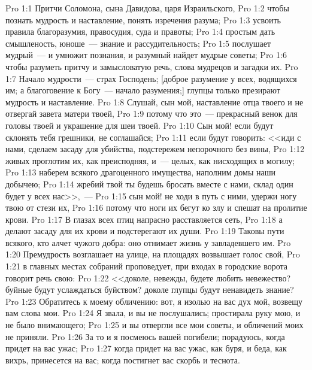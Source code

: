 \vs Pro 1:1 Притчи Соломона, сына Давидова, царя Израильского,
\vs Pro 1:2 чтобы познать мудрость и наставление, понять изречения разума;
\vs Pro 1:3 усвоить правила благоразумия, правосудия, суда и правоты;
\vs Pro 1:4 простым дать смышленость, юноше~--- знание и рассудительность;
\vs Pro 1:5 послушает мудрый~--- и умножит познания, и разумный найдет мудрые советы;
\vs Pro 1:6 чтобы разуметь притчу и замысловатую речь, слова мудрецов и загадки их.
\rsbpar\vs Pro 1:7 Начало мудрости~--- страх Господень; [доброе разумение у всех, водящихся им; а благоговение к Богу~--- начало разумения;] глупцы только презирают мудрость и наставление.
\vs Pro 1:8 Слушай, сын мой, наставление отца твоего и не отвергай завета матери твоей,
\vs Pro 1:9 потому что это~--- прекрасный венок для головы твоей и украшение для шеи твоей.
\vs Pro 1:10 Сын мой! если будут склонять тебя грешники, не соглашайся;
\vs Pro 1:11 если будут говорить: <<иди с нами, сделаем засаду для убийства, подстережем непорочного без вины,
\vs Pro 1:12 живых проглотим их, как преисподняя, и~--- целых, как нисходящих в могилу;
\vs Pro 1:13 наберем всякого драгоценного имущества, наполним домы наши добычею;
\vs Pro 1:14 жребий твой ты будешь бросать вместе с нами, склад один будет у всех нас>>,~---
\vs Pro 1:15 сын мой! не ходи в путь с ними, удержи ногу твою от стези их,
\vs Pro 1:16 потому что ноги их бегут ко злу и спешат на пролитие крови.
\vs Pro 1:17 В глазах всех птиц напрасно расставляется сеть,
\vs Pro 1:18 а делают засаду для их крови и подстерегают их души.
\vs Pro 1:19 Таковы пути всякого, кто алчет чужого добра: оно отнимает жизнь у завладевшего им.
\rsbpar\vs Pro 1:20 Премудрость возглашает на улице, на площадях возвышает голос свой,
\vs Pro 1:21 в главных местах собраний проповедует, при входах в городские ворота говорит речь свою:
\vs Pro 1:22 <<доколе, невежды, будете любить невежество?  буйные будут услаждаться буйством? доколе глупцы будут ненавидеть знание?
\vs Pro 1:23 Обратитесь к моему обличению: вот, я изолью на вас дух мой, возвещу вам слова мои.
\vs Pro 1:24 Я звала, и вы не послушались; простирала руку мою, и не было внимающего;
\vs Pro 1:25 и вы отвергли все мои советы, и обличений моих не приняли.
\vs Pro 1:26 За то и я посмеюсь вашей погибели; порадуюсь, когда придет на вас ужас;
\vs Pro 1:27 когда придет на вас ужас, как буря, и беда, как вихрь, принесется на вас; когда постигнет вас скорбь и теснота.
